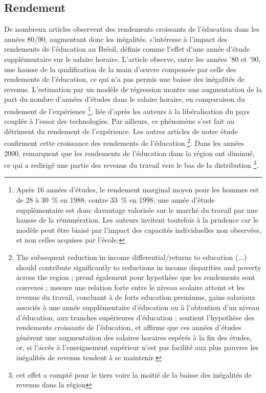 \documentclass[pagesize, twoside=off, bibliography=totoc, DIV=calc, fontsize=12pt, a4paper, french]{scrartcl}
\begin{document}
\subsection{Rendement}

\label{sec_rendement}

De nombreux articles observent des rendements croissants de l’éducation dans les années 80/90, augmentant donc les inégalités.  s’intéresse à l’impact des rendements de l’éducation au Brésil, définis comme l’effet d’une année d’étude supplémentaire sur le salaire horaire. L’article observe, entre les années ’80 et ’90, une hausse de la qualification de la main d’œuvre compensée par celle des rendements de l’éducation, ce qui n’a pas permis une baisse des inégalités de revenus. L’estimation par un modèle de régression montre une augmentation de la part du nombre d’années d’études dans le salaire horaire, en comparaison du rendement de l’expérience \footnote{Après 16 années d'études, le rendement marginal moyen pour les hommes est de 28 à \SI{30}{\percent} en 1988, contre \SI{33}{\percent} en 1998, une année d’étude supplémentaire est donc davantage valorisée sur le marché du travail par une hausse de la rémunération. Les auteurs invitent toutefois à la prudence car le modèle peut être biaisé par l’impact des capacités individuelles non observées, et non celles acquises par l’école.}, liée d’après les auteurs à la libéralisation du pays couplée à l’essor des technologies. Par ailleurs, ce phénomène s’est fait au détriment du rendement de l’expérience. Les autres articles de notre étude confirment cette croissance des rendements de l’éducation \footnote{\og{}The subsequent reduction in income differential/returns to education (...) should contribute significantly to reductions in income disparities and poverty across the region\fg{} \citep{psacharopoulos_poverty_1995}; \citet{ferreira_rise_2008} prend également pour hypothèse que les rendements sont convexes ; \citet{carlson_education_2002} mesure une relation forte entre le niveau scolaire atteint et les revenus du travail, concluant à de forts \og{}education premiums\fg{}, gains salariaux associés à une année supplémentaire d’éducation ou à l’obtention d’un niveau d’éducation, aux tranches supérieures d’éducation ; \citet{urbina_intergenerational_2018} soutient l’hypothèse des rendements croissants de l’éducation, et affirme que ces années d’études génèrent une augmentation des salaires horaires espérés à la fin des études, or, si l’accès à l’enseignement supérieur n’est pas facilité aux plus pauvres les inégalités de revenus tendent à se maintenir.}. Dans les années 2000, \citet{levy} remarquent que les rendements de l’éducation dans la région ont diminué, ce qui a redirigé une partie des revenus du travail vers le bas de la distribution \footnote{cet effet a compté pour le tiers voire la moitié de la baisse des inégalités de revenus dans la région}.
\end{document}
